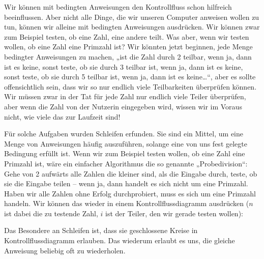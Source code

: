 
Wir können mit bedingten Anweisungen den Kontrollfluss schon hilfreich
beeinflussen. Aber nicht alle Dinge, die wir unseren Computer anweisen wollen zu
tun, können wir alleine mit bedingten Anweisungen ausdrücken. Wir können zwar
zum Beispiel testen, ob eine Zahl, eine andere teilt. Was aber, wenn wir testen
wollen, ob eine Zahl eine Primzahl ist? Wir könnten jetzt beginnen, jede Menge
bedingter Anweisungen zu machen, „ist die Zahl durch 2 teilbar, wenn ja, dann
ist es keine, sonst teste, ob sie durch 3 teilbar ist, wenn ja, dann ist es
keine, sonst teste, ob sie durch 5 teilbar ist, wenn ja, dann ist es
keine\dots“, aber es sollte offensichtlich sein, dass wir so nur endlich viele
Teilbarkeiten überprüfen können. Wir müssen zwar in der Tat für jede Zahl nur
endlich viele Teiler überprüfen, aber wenn die Zahl von der Nutzerin eingegeben
wird, wissen wir im Voraus nicht, wie viele das zur Laufzeit sind!

Für solche Aufgaben wurden Schleifen erfunden. Sie sind ein Mittel, um eine
Menge von Anweisungen häufig auszuführen, solange eine von uns fest gelegte
Bedingung erfüllt ist. Wenn wir zum Beispiel testen wollen, ob eine Zahl eine
Primzahl ist, wäre ein einfacher Algorithmus die so genannte „Probedivision“:
Gehe von 2 aufwärts alle Zahlen die kleiner sind, als die Eingabe durch, teste,
ob sie die Eingabe teilen -- wenn ja, dann handelt es sich nicht um eine
Primzahl. Haben wir alle Zahlen ohne Erfolg durchprobiert, muss es sich um eine
Primzahl handeln. Wir können das wieder in einem Kontrollflussdiagramm
ausdrücken ($n$ ist dabei die zu testende Zahl, $i$ ist der Teiler, den wir
gerade testen wollen):

\begin{center}
\end{center}
Das Besondere an Schleifen ist, dass sie geschlossene Kreise in
Kontrollflussdiagramm erlauben. Das wiederum erlaubt es uns, die gleiche
Anweisung beliebig oft zu wiederholen.

